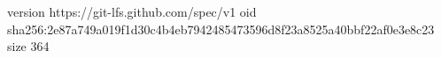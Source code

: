 version https://git-lfs.github.com/spec/v1
oid sha256:2e87a749a019f1d30c4b4eb7942485473596d8f23a8525a40bbf22af0e3e8c23
size 364
